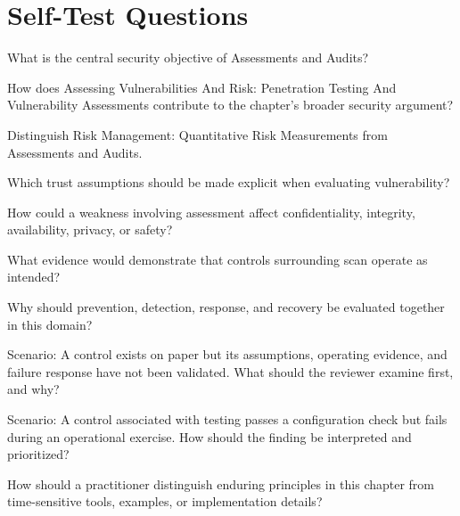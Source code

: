 \documentclass[11pt,letterpaper]{article}
\begin{document}
\section*{Self-Test Questions}
\begin{CornellRecallList}
\item What is the central security objective of Assessments and Audits?
\item How does Assessing Vulnerabilities And Risk: Penetration Testing And Vulnerability Assessments contribute to the chapter's broader security argument?
\item Distinguish Risk Management: Quantitative Risk Measurements from Assessments and Audits.
\item Which trust assumptions should be made explicit when evaluating vulnerability?
\item How could a weakness involving assessment affect confidentiality, integrity, availability, privacy, or safety?
\item What evidence would demonstrate that controls surrounding scan operate as intended?
\item Why should prevention, detection, response, and recovery be evaluated together in this domain?
\item Scenario: A control exists on paper but its assumptions, operating evidence, and failure response have not been validated. What should the reviewer examine first, and why?
\item Scenario: A control associated with testing passes a configuration check but fails during an operational exercise. How should the finding be interpreted and prioritized?
\item How should a practitioner distinguish enduring principles in this chapter from time-sensitive tools, examples, or implementation details?
\end{CornellRecallList}
\end{document}
